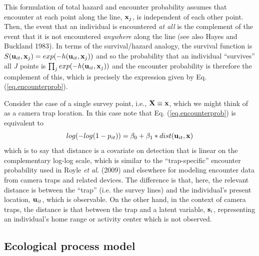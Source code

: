 This formulation of total hazard and encounter probability assumes
that encounter at each point along the line, ${\bf x}_{j}$, is
independent of each other point. Then, the event that an individual is
encountered {\it at all} is the complement of the event that it is not
encountered {\it anywhere} along the line (see also Hayes and Buckland
1983).  In terms of the survival/hazard analogy, the survival function
is $S({\bf u}_{it},{\bf x}_{j}) = exp(-h({\bf u}_{it},{\bf x}_{j}))$
and so the probability that an individual ``survives'' all $J$ points
is $\prod_{j} exp(-h({\bf u}_{it},{\bf x}_{j}))$ and the encounter
probability is therefore the complement of this, which is precisely
the expression given by Eq. (\ref{eq.encounterprob}).

Consider the case of a single survey point, i.e., ${\bf X} \equiv {\bf
  x}$, which we might think of as a camera trap location.  In this
case note that Eq. (\ref{eq.encounterprob}) is equivalent to
\[
log(-log(1-p_{it})) = \beta_{0} + \beta_{1}*dist( {\bf u}_{it},{\bf x})
\]
which is to say that distance is a covariate on detection that is
linear on the complementary log-log scale, which is similar to the
``trap-specific'' encounter probability used in Royle {\it et al.}
(2009) and elsewhere for modeling encounter data from camera traps and
related devices. The difference is that, here, the relevant distance
is between the ``trap'' (i.e. the survey lines) and the individual's
present location, ${\bf u}_{it}$, which is observable. On the other
hand, in the context of camera traps, the distance is that between the
trap and a latent variable, ${\bf s}_{i}$, representing an
individual's home range or activity center which is not observed.





\subsection{Ecological process model } 

